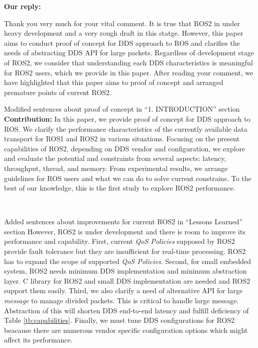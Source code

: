 \documentclass{article}
\begin{document}
\begin{itemize}
  \begin{flushleft}
    \textbf{Our reply:}
  \end{flushleft}
  Thank you very much for your vital comment.
  It is true that ROS2 in under heavy development and a very rough draft in this statge.
  However, this paper aims to conduct proof of concept for DDS approach to ROS and clarifies the needs of abstracting DDS API for large packets.
  Regardless of development stage of ROS2, we consider that understanding each DDS characteristics is meaningful for ROS2 users, which we provide in this paper.
  After reading your comment, we have highlighted that this paper aims to proof of concept and arranged premature points of current ROS2.
  \begin{itembox}[|]{Modified sentences about proof of concept in ``1. INTRODUCTION'' section}
    \textbf{Contribution:}
    In this paper, we provide proof of concept for DDS approach to ROS.
    We clarify the performance characteristics of the currently available data transport for ROS1 and ROS2 in various situations.
    Focusing on the present capabilities of ROS2, depending on DDS vendor and configuration, we explore and evaluate the potential and constraints from several aspects: latency, throughput, thread, and memory.
    From experimental results, we arrange guidelines for ROS users and what we can do to solve current constrains.
    To the best of our knowledge, this is the first study to explore ROS2 performance.
  \end{itembox}\\
  \begin{itembox}[|]{Added sentences about improvements for current ROS2 in ``Lessons Learned'' section}
    However, ROS2 is under development and there is room to improve its performance and capability.
    First, current \emph{QoS Policies} supposed by ROS2 provide fault tolerance but they are insufficient for real-time processing.
    ROS2 has to expand the scope of supported \emph{QoS Policies}.
    Second, for small embedded system, ROS2 needs minimum DDS implementation and minimum abstraction layer.
    C library for ROS2 and small DDS implementation are needed and ROS2 support them easily.
    Third, we also clarify a need of alternative API for large \emph{message} to manage divided packets.
    This is critical to handle large message.
    Abstraction of this will shorten DDS end-to-end latency and fulfill deficiency of Table \ref{tb:capabilities}.
    Finally, we must tune DDS configurations for ROS2 beacause there are numerous vendor specific configuration options which might affect its performance.
  \end{itembox}\\

\end{itemize}
\end{document}

